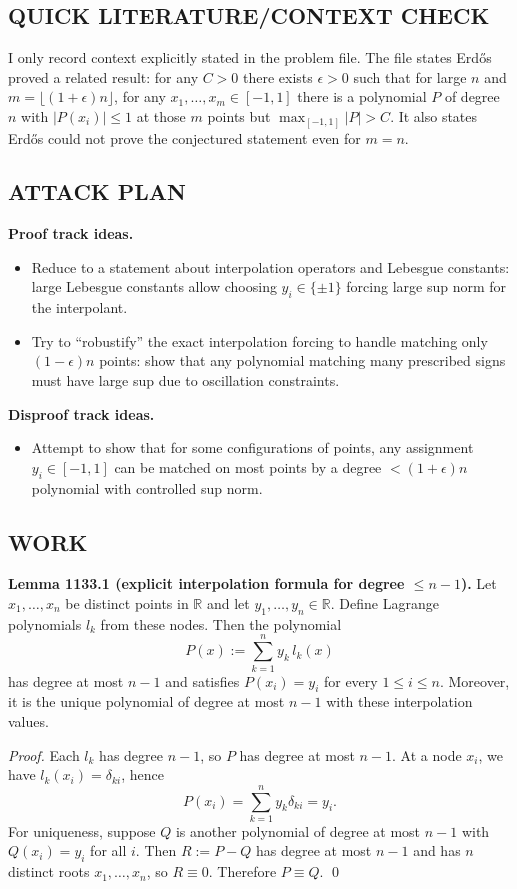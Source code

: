 \subsection*{QUICK LITERATURE/CONTEXT CHECK}
I only record context explicitly stated in the problem file.
The file states Erd\H{o}s proved a related result: for any $C>0$ there exists $\epsilon>0$ such that for large $n$ and $m=\lfloor(1+\epsilon)n\rfloor$, for any $x_1,\dots,x_m\in[-1,1]$ there is a polynomial $P$ of degree $n$ with $|P(x_i)|\le 1$ at those $m$ points but $\max_{[-1,1]}|P|>C$.
It also states Erd\H{o}s could not prove the conjectured statement even for $m=n$.

\subsection*{ATTACK PLAN}
\textbf{Proof track ideas.}
\begin{itemize}
\item Reduce to a statement about interpolation operators and Lebesgue constants: large Lebesgue constants allow choosing $y_i\in\{\pm 1\}$ forcing large sup norm for the interpolant.
\item Try to ``robustify'' the exact interpolation forcing to handle matching only $(1-\epsilon)n$ points: show that any polynomial matching many prescribed signs must have large sup due to oscillation constraints.
\end{itemize}
\textbf{Disproof track ideas.}
\begin{itemize}
\item Attempt to show that for some configurations of points, any assignment $y_i\in[-1,1]$ can be matched on most points by a degree $<(1+\epsilon)n$ polynomial with controlled sup norm.
\end{itemize}

\subsection*{WORK}
\textbf{Lemma 1133.1 (explicit interpolation formula for degree $\le n-1$).}
Let $x_1,\dots,x_n$ be distinct points in $\mathbb{R}$ and let $y_1,\dots,y_n\in\mathbb{R}$.
Define Lagrange polynomials $l_k$ from these nodes.
Then the polynomial
\[
P(x):=\sum_{k=1}^n y_k\,l_k(x)
\]
has degree at most $n-1$ and satisfies $P(x_i)=y_i$ for every $1\le i\le n$.
Moreover, it is the unique polynomial of degree at most $n-1$ with these interpolation values.

\emph{Proof.}
Each $l_k$ has degree $n-1$, so $P$ has degree at most $n-1$.
At a node $x_i$, we have $l_k(x_i)=\delta_{ki}$, hence
\[
P(x_i)=\sum_{k=1}^n y_k\delta_{ki}=y_i.
\]
For uniqueness, suppose $Q$ is another polynomial of degree at most $n-1$ with $Q(x_i)=y_i$ for all $i$.
Then $R:=P-Q$ has degree at most $n-1$ and has $n$ distinct roots $x_1,\dots,x_n$, so $R\equiv 0$.
Therefore $P\equiv Q$.
\qed

